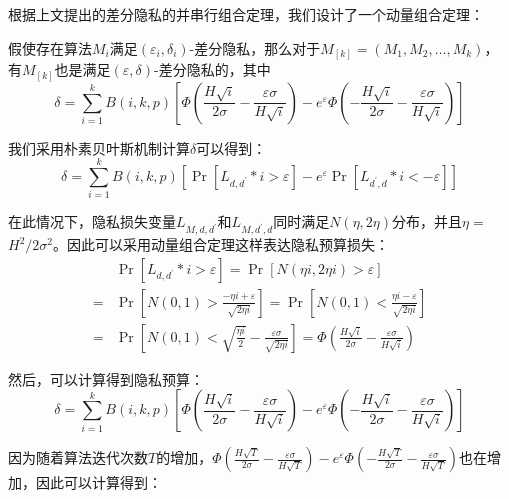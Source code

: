 根据上文提出的差分隐私的并串行组合定理，我们设计了一个动量组合定理：
\begin{theorem}[动量组合定理]\label{动量组合定理}
假使存在算法$M_{i}$满足$\left(\varepsilon_{i}, \delta_{i}\right)$-差分隐私，那么对于$M_{[k]}=\left(M_{1}, M_{2}, \ldots, M_{k}\right)$，有$M_{[k]}$也是满足$(\varepsilon, \delta)$-差分隐私的，其中
$$
\delta=\sum_{i=1}^{k} B(i, k, p)\left[\Phi\left(\frac{H \sqrt{i}}{2 \sigma}-\frac{\varepsilon \sigma}{H \sqrt{i}}\right)-e^{\varepsilon} \Phi\left(-\frac{H \sqrt{i}}{2 \sigma}-\frac{\varepsilon \sigma}{H \sqrt{i}}\right)\right]
$$
\end{theorem}

我们采用朴素贝叶斯机制计算$\delta$可以得到：
\begin{equation}\label{eq:朴素贝叶斯}
\delta=\sum_{i=1}^{k} B(i, k, p)\left[\operatorname{Pr}\left[L_{d, d^{\prime}} * i>\varepsilon\right]-e^{\varepsilon} \operatorname{Pr}\left[L_{d^{\prime}, d} * i<-\varepsilon\right]\right]
\end{equation}

在此情况下，隐私损失变量$L_{M, d, d^{\prime}}$和$L_{M, d^{\prime}, d}$同时满足$N(\eta, 2 \eta)$分布，并且$\eta=$ $H^{2} / 2 \sigma^{2}$。因此可以采用动量组合定理这样表达隐私预算损失：
\begin{equation}\label{eq:隐私预算计算1}
\begin{aligned}
& \operatorname{Pr}\left[L_{d, d^{\prime}} * i>\varepsilon\right]=\operatorname{Pr}[N(\eta i, 2 \eta i)>\varepsilon] \\
=& \operatorname{Pr}\left[N(0,1)>\frac{-\eta i+\varepsilon}{\sqrt{2 \eta i}}\right]=\operatorname{Pr}\left[N(0,1)<\frac{\eta i-\varepsilon}{\sqrt{2 \eta i}}\right] \\
=& \operatorname{Pr}\left[N(0,1)<\sqrt{\frac{\eta i}{2}}-\frac{\varepsilon \sigma}{\sqrt{2 \eta i}}\right]=\Phi\left(\frac{H \sqrt{i}}{2 \sigma}-\frac{\varepsilon \sigma}{H \sqrt{i}}\right)
\end{aligned}
\end{equation}

然后，可以计算得到隐私预算：
\begin{equation}\label{eq:隐私预算计算2}
\delta=\sum_{i=1}^{k} B(i, k, p)\left[\Phi\left(\frac{H \sqrt{i}}{2 \sigma}-\frac{\varepsilon \sigma}{H \sqrt{i}}\right)-e^{\varepsilon} \Phi\left(-\frac{H \sqrt{i}}{2 \sigma}-\frac{\varepsilon \sigma}{H \sqrt{i}}\right)\right]
\end{equation}

因为随着算法迭代次数$T$的增加，$\Phi\left(\frac{H \sqrt{T}}{2 \sigma}-\frac{\varepsilon \sigma}{H \sqrt{T}}\right)-e^{\varepsilon} \Phi\left(-\frac{H \sqrt{T}}{2 \sigma}-\frac{\varepsilon \sigma}{H \sqrt{T}}\right)$也在增加，因此可以计算得到：

